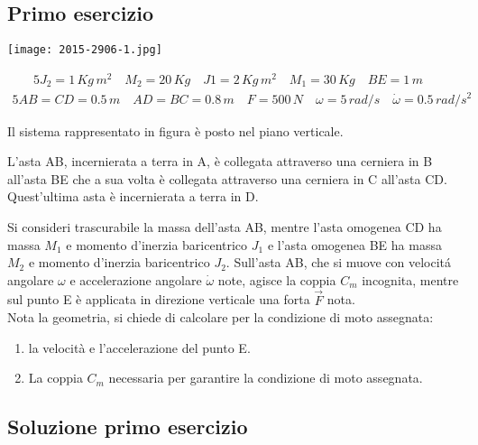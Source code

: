 \documentclass[main.tex]{subfiles}
\begin{document}
\subsection{Primo esercizio}

 \texttt{[image: 2015-2906-1.jpg]}

\begin{alignat*}{5}
  J_2 = 1\,Kg\,m^2 \quad
  M_2 = 20\,Kg \quad
  J1 = 2\,Kg\,m^2\quad
  M_1 = 30\,Kg\quad
  BE = 1\,m\quad
\end{alignat*}
\begin{alignat*}{5}
  AB = CD = 0.5\,m\quad
  AD=BC=0.8\,m\quad
  F=500\,N\quad
  \omega = 5\,rad/s\quad
  \dot{\omega} = 0.5\,rad/s^2
\end{alignat*}


Il sistema rappresentato in figura è posto nel piano verticale.

L’asta AB, incernierata a terra in A, è collegata attraverso una cerniera in B all’asta BE che a sua volta è collegata attraverso una cerniera in C all’asta CD. Quest’ultima asta è incernierata a terra in D.

Si consideri trascurabile la massa dell’asta AB, mentre l’asta omogenea CD ha massa $M_1$ e momento d’inerzia baricentrico $J_1$ e l’asta omogenea BE ha massa $M_2$ e momento d’inerzia baricentrico $J_2$. Sull’asta AB, che si muove con velocit\'a angolare $\omega$ e accelerazione angolare $\dot{\omega}$ note, agisce la coppia $C_m$ incognita, mentre sul punto E è applicata in direzione verticale una forta $\vec{F}$ nota.
\\

Nota la geometria, si chiede di calcolare per la condizione di moto assegnata:
\begin{enumerate}
  \item la velocità e l'accelerazione del punto E.
  \item La coppia $C_m$ necessaria per garantire la condizione di moto assegnata.
\end{enumerate}

\pagebreak

\subsection{Soluzione primo esercizio}
\end{document}
